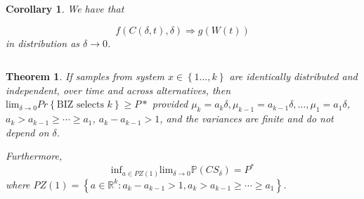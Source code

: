 \documentclass{wscpaperproc}
\theoremstyle{wsc}
\newtheorem{theorem}{Theorem}
\newtheorem{corollary}{Corollary}
\begin{document}
\begin{corollary}

We have that 

\[
f\left(C\left(\delta,t\right),\delta\right)\Rightarrow g\left(W\left(t\right)\right)
\]
in distribution as $\delta\rightarrow0$.

\[
\]
\end{corollary}
\vspace{1mm}

\begin{theorem}
If samples from system $x\in\left\{ 1\ldots,k\right\} $ are identically
distributed and independent, over time and across alternatives, then
$\mbox{lim}_{\delta\rightarrow0}Pr\left\{ \mbox{BIZ selects }k\right\} \geq P*$
provided $\mu_{k}=a_{k}\delta,\mu_{k-1}=a_{k-1}\delta,\ldots,\mu_{1}=a_{1}\delta$,
$a_{k}>a_{k-1}\geq \cdots \geq a_{1}$, $a_{k}-a_{k-1}>1$, and the variances are finite and
do not depend on $\delta$.

Furthermore,
\[
\mbox{inf}_{a\in PZ\left(1\right)}\mbox{lim}_{\delta\rightarrow0}\mathbb{P}\left(CS_{\delta}\right)=P^{*}
\]
where $PZ\left(1\right)=\left\{ a\in\mathbb{R}^{k}:a_{k}-a_{k-1}>1, a_{k}>a_{k-1}\geq \cdots \geq a_{1} \right\} $. 

\end{theorem}
\end{document}
